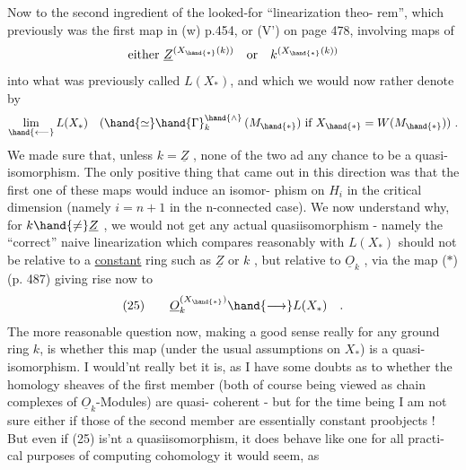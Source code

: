 Now to the second ingredient of the looked-for ``linearization theo-%
rem'', which previously was the first map in (w) p.454, or (V') on page
478, involving maps of 
\[ \text{either } \underline{Z}^{(X_{\hand{*}}(k))} \quad \text{or} \quad k^{(X_{\hand{*}}(k))} \]
into what was previously called $L(X_*)$, and which we  would now
rather denote by
\[ \underset{\hand{\longleftarrow}}{\lim}\, L(X_*) \quad ( \hand{\simeq} \hand{\Gamma}_k^{\hand{\wedge}}\,(M_{\hand{*}}) \ \text{if} \ X_{\hand{*}} = W(M_{\hand{*}}) ) \ . \]
We made sure that, unless $k=\underline{Z}$ , none of the two ad any chance to be
a quasi-isomorphism. The only positive thing that came out in this
direction was that the first one of these maps would induce an isomor-%
phism on $H_i$ in the critical dimension (namely $i=n+1$ in the n-connected
case). We now understand why,  for $k \hand{\neq} \underline{Z}$ , we would not get any
actual quasiisomorphism - namely the ``correct'' naive linearization
which compares reasonably with $L(X_*)$ should not be relative to a
\uline{constant} ring such as $\underline{Z}$ or $k$ , but relative to $\underline{O}_k$ , via the map
($*$) (p. 487) giving rise now to
\[ (25) \qquad \underline{O}_k^{(X_{\hand{*}})} \hand{\longrightarrow} L(X_*) \quad . \]
The more reasonable question now, making a good sense really for any
ground ring $k$, is whether this map (under the usual assumptions on $X_*$)
is a quasi-isomorphism. I would'nt really bet it is, as I have some
doubts as to whether the homology sheaves of the first member (both
 of course being viewed as chain complexes of $\underline{O}_k$-Modules) are quasi-%
coherent - but for the time being I am not sure either if those of
the second member are essentially constant proobjects ! But even if
(25) is'nt a quasiisomorphism, it does behave like one for all practi-%
cal purposes of computing cohomology\hand{,} it would seem, as 


